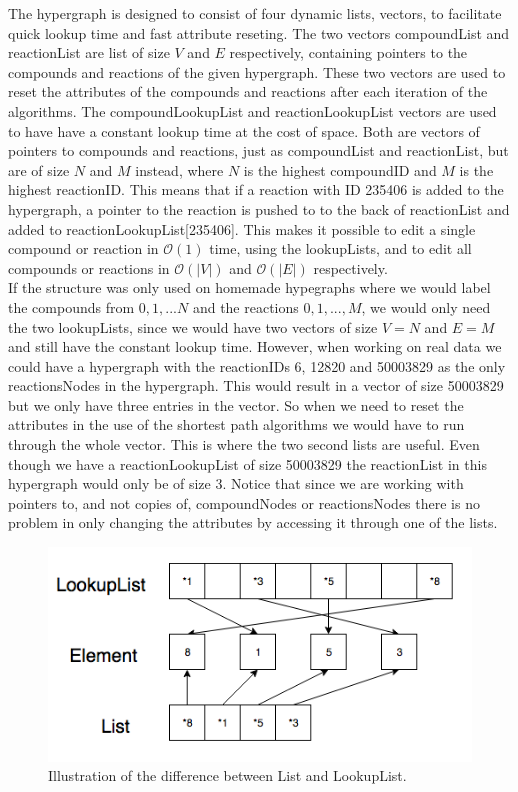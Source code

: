\documentclass[a4paper,10pt,titlepage]{paper}
\begin{document}
The hypergraph is designed to consist of four dynamic lists, vectors, to facilitate quick lookup time and fast attribute reseting. The two vectors compoundList and reactionList are list of size $V$ and $E$ respectively, containing pointers to the compounds and reactions of the given hypergraph. These two vectors are used to reset the attributes of the compounds and reactions after each iteration of the algorithms. The compoundLookupList and reactionLookupList vectors are used to have have a constant lookup time at the cost of space. Both are vectors of pointers to compounds and reactions, just as compoundList and reactionList, but are of size $N$ and $M$ instead, where $N$ is the highest compoundID and $M$ is the highest reactionID. This means that if a reaction with ID 235406 is added to the hypergraph, a pointer to the reaction is pushed to to the back of reactionList and added to reactionLookupList[235406]. This makes it possible to edit a single compound or reaction in $\mathcal{O}(1)$ time, using the lookupLists, and to edit all compounds or reactions in $\mathcal{O}(|V|)$ and $\mathcal{O}(|E|)$ respectively.\\
If the structure was only used on homemade hypegraphs where we would label the compounds from $0,1, ... N$ and the reactions $0,1,...,M$, we would only need the two lookupLists, since we would have two vectors of size $V=N$ and $E=M$ and still have the constant lookup time. However, when working on real data we could have a hypergraph with the reactionIDs 6, 12820 and 50003829 as the only reactionsNodes in the hypergraph. This would result in a vector of size 50003829 but we only have three entries in the vector. So when we need to reset the attributes in the use of the shortest path algorithms we would have to run through the whole vector. This is where the two second lists are useful. Even though we have a reactionLookupList of size 50003829 the reactionList in this hypergraph would only be of size 3.
Notice that since we are working with pointers to, and not copies of, compoundNodes or reactionsNodes there is no problem in only changing the attributes by accessing it through one of the lists. 
\begin{figure}[H]
\centering
\includegraphics[scale=0.5]{Billeder/ListOverview.png}
\caption{Illustration of the difference between List and LookupList.}
\label{fig::ListLookupList}
\end{figure}
\end{document}

